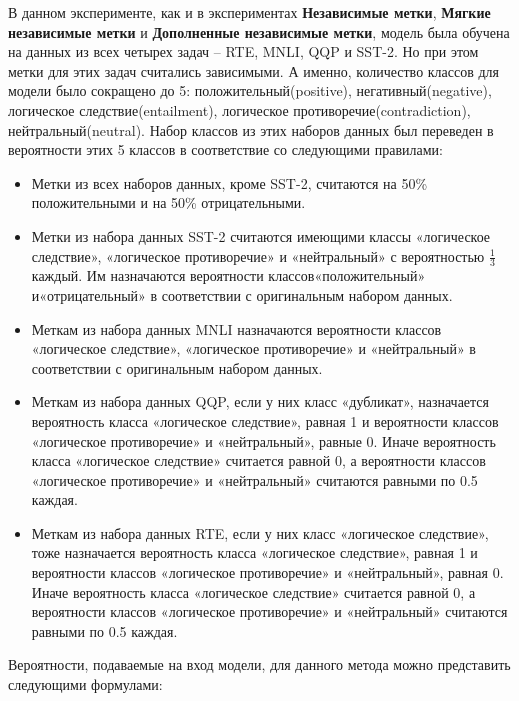 В данном эксперименте, как и в экспериментах \textbf{Независимые метки}, \textbf{Мягкие независимые метки} и \textbf{Дополненные независимые метки}, модель была обучена на данных из всех четырех задач -- RTE, MNLI, QQP и SST-2. Но при этом метки для этих задач считались зависимыми. А именно, количество классов для модели было сокращено до 5: положительный(positive), негативный(negative), логическое следствие(entailment), логическое противоречие(contradiction), нейтральный(neutral). Набор классов из этих наборов данных был переведен в вероятности этих 5 классов в соответствие со следующими правилами:
\begin{itemize}
\item Метки из всех наборов данных, кроме SST-2, считаются на 50\% положительными и на 50\% отрицательными.
\item Метки из набора данных SST-2 считаются имеющими классы «логическое следствие», «логическое противоречие» и «нейтральный» с вероятностью $\frac{1}{3}$ каждый. Им назначаются вероятности классов«положительный» и«отрицательный» в соответствии с оригинальным набором данных.
\item Меткам из набора данных MNLI назначаются вероятности классов «логическое следствие», «логическое противоречие» и «нейтральный» в соответствии с оригинальным набором данных.
\item Меткам из набора данных QQP, если у них класс «дубликат», назначается вероятность класса «логическое следствие», равная 1 и вероятности классов «логическое противоречие» и «нейтральный», равные 0. Иначе вероятность класса «логическое следствие» считается равной 0, а вероятности классов «логическое противоречие» и «нейтральный» считаются равными по 0.5 каждая.
\item Меткам из набора данных RTE, если у них класс «логическое следствие», тоже назначается вероятность класса «логическое следствие», равная 1 и вероятности классов «логическое противоречие» и «нейтральный», равная 0. Иначе вероятность класса «логическое следствие» считается равной 0, а вероятности классов «логическое противоречие» и «нейтральный» считаются равными по 0.5 каждая.
\end{itemize}

Вероятности, подаваемые на вход модели, для данного метода можно представить следующими формулами:

